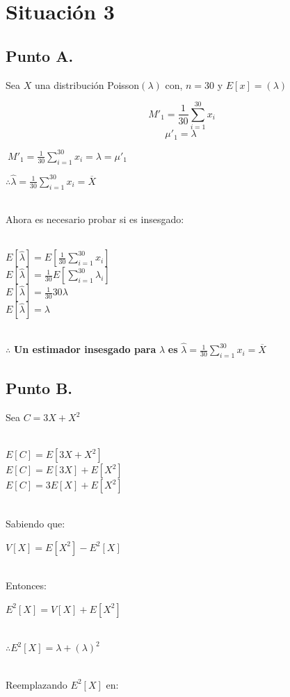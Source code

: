 \documentclass[letterpaper,12pt,onecolumn,titlepage]{article}
\begin{document}
\section{Situaci\'{o}n 3}
\subsection{Punto A.}

Sea $X$ una distribuci\'{o}n Poisson$(\lambda)$ con, $n=30$ y $E[x]=(\lambda)$

$$\ M'_1 = \frac{1}{30} \sum_{i=1}^{30}x_{i}$$
$$\mu'_1 = \lambda$$

$\ M'_1 = \frac{1}{30} \sum_{i=1}^{30}x_{i} = \lambda = \mu'_1$

$\therefore \hat{\lambda}= \frac{1}{30} \sum_{i=1}^{30}x_{i} = \overline{X}$
 
~\\Ahora es necesario probar si es insesgado: 

~\\$E[\hat{\lambda}]=E[\frac{1}{30} \sum_{i=1}^{30}x_{i}]$
~\\$E[\hat{\lambda}]=\frac{1}{30} E[\sum_{i=1}^{30}{\lambda}_{i}]$
~\\$E[\hat{\lambda}]=\frac{1}{30}30\lambda$
~\\$E[\hat{\lambda}]=\lambda$

~\\$\therefore$ \textbf{Un estimador insesgado para} $\lambda$ \textbf{es} $\hat{\lambda}= \frac{1}{30} \sum_{i=1}^{30}x_{i} = \overline{X}$

\subsection{Punto B.}

Sea $C=3X+X^2$

~\\$E[C]=E[3X+X^2]$
~\\$E[C]=E[3X] + E[X^2]$
~\\$E[C]=3E[X] + E[X^2]$

~\\ Sabiendo que:
 
$V[X]=E[X^2] - E^2[X]$


~\\ Entonces: 

$E^2[X] = V[X] + E[X^2]$

~\\$\therefore E^2[X] = \lambda + (\lambda)^2$

~\\ Reemplazando $E^2[X]$ en:\ 
\end{document}

